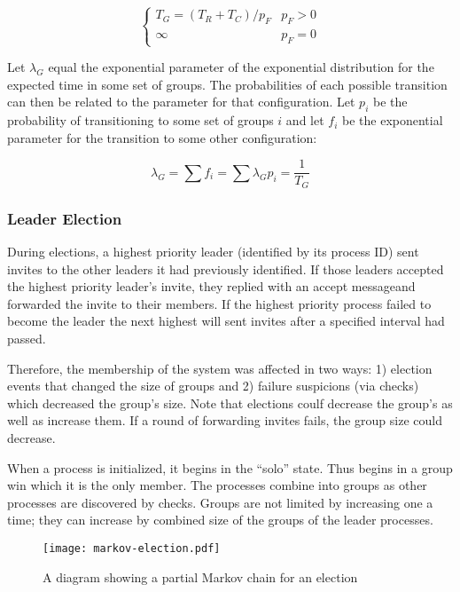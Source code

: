 \begin{equation}
\begin{cases}
T_{G} = ( T_{R}+T_{C}  ) / p_{F} & p_{F} > 0 \\
\infty & p_{F} = 0
\end{cases}
\end{equation}

Let $\lambda_{G}$ equal the exponential parameter of the exponential distribution for the expected time in some set of groups.
The probabilities of each possible transition can then be related to the parameter for that configuration.
Let $p_{i}$ be the probability of transitioning to some set of groups $i$ and let $f_{i}$ be the exponential parameter for the transition to some other configuration:

\begin{equation}
\lambda_{G} = \sum f_{i} = \sum \lambda_{G} p_{i} = \frac{1}{T_{G}}
\end{equation}

\subsubsection{Leader Election}

During elections, a highest priority leader (identified by its process ID) sent invites to the other leaders it had previously identified.
If those leaders accepted the highest priority leader's invite, they replied with an accept messageand forwarded the invite to their members.
If the highest priority process failed to become the leader the next highest will sent invites after a specified interval had passed.

Therefore, the membership of the system was affected in two ways: 1) election events that changed the size of groups and 2) failure suspicions (via checks) which decreased the group's size.
Note that elections coulf decrease the group's as well as increase them.
If a round of forwarding invites fails, the group size could decrease.

When a process is initialized, it begins in the ``solo'' state.
Thus begins in a group win which it is the only member. 
The processes combine into groups as other processes are discovered by checks.
Groups are not limited by increasing one a time; they can increase by combined size of the groups of the leader processes.

\begin{figure}[!h]
\centering
\texttt{[image: markov-election.pdf]}
\caption{A diagram showing a partial Markov chain for an election}
\label{fig:MARKOVELECTION}
\end{figure}

